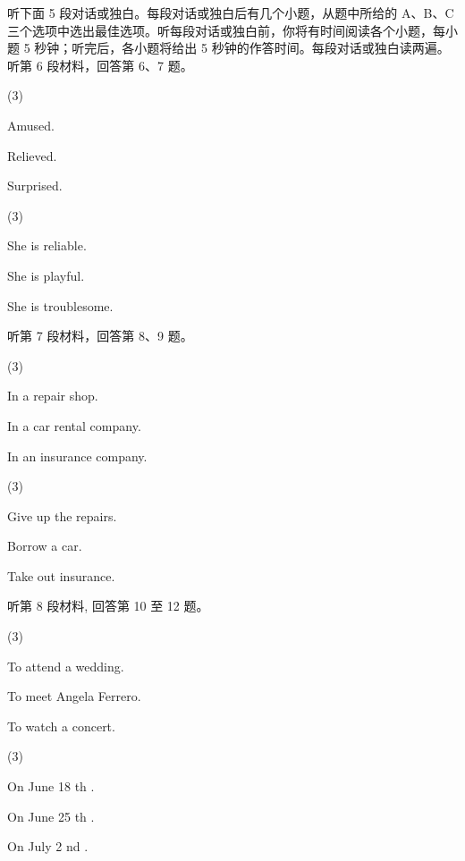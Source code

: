 \documentclass{英语试卷}
\begin{document}
\par 听下面 5 段对话或独白。每段对话或独白后有几个小题，从题中所给的 A、B、C 三个选项中选出最佳选项。听每段对话或独白前，你将有时间阅读各个小题，每小题 5 秒钟；听完后，各小题将给出 5 秒钟的作答时间。每段对话或独白读两遍。 听第 6 段材料，回答第 6、7 题。\par
{}
\begin{choices}(3)
  \item Amused.
  \item Relieved.
  \item Surprised.
\end{choices}
\begin{choices}(3)
  \item She is reliable.
  \item She is playful.
  \item She is troublesome.
\end{choices}
\par 听第 7 段材料，回答第 8、9 题。\par
{}
\begin{choices}(3)
  \item In a repair shop.
  \item In a car rental company.
  \item In an insurance company.
\end{choices}
\begin{choices}(3)
  \item Give up the repairs.
  \item Borrow a car.
  \item Take out insurance.
\end{choices}
\par 听第 8 段材料, 回答第 10 至 12 题。\par
{}
\begin{choices}(3)
  \item To attend a wedding.
  \item To meet Angela Ferrero.
  \item To watch a concert.
\end{choices}
\begin{choices}(3)
  \item On June 18 th .
  \item On June 25 th .
  \item On July 2 nd .
\end{choices}
\end{document}
